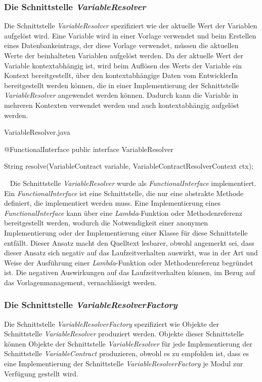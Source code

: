 \subsubsection{Die Schnittstelle \emph{VariableResolver}}
\label{sec:variableResolver}
Die Schnittstelle \emph{VariableResolver} spezifiziert wie der aktuelle Wert der Variablen aufgelöst wird. Eine Variable wird in einer Vorlage verwendet und beim Erstellen eines Datenbankeintrags, der diese Vorlage verwendet, müssen die aktuellen Werte der beinhalteten Variablen aufgelöst werden. Da der aktuelle Wert der Variable kontextabhängig ist, wird beim Auflösen des Werts der Variable ein Kontext bereitgestellt, über den kontextabhängige Daten vom EntwicklerIn bereitgestellt werden können, die in einer Implementierung der Schnittstelle \emph{VariableResolver} angewendet werden können. Dadurch kann die Variable in mehreren Kontexten verwendet werden und auch kontextabhängig aufgelöst werden.
\begin{program}[h]
\caption{VariableResolver.java}
\label{prog:variableResolver}
\begin{JavaCode}
@FunctionalInterface
public interface VariableResolver {

    String resolve(VariableContract variable,
                   VariableContractResolverContext ctx);
}
\end{JavaCode}
\end{program}
\ \newline
Die Schnittstelle \emph{VariableResolver} wurde als \emph{FunctionalInterface} implementiert. Ein \emph{FunctionalInterface} ist eine Schnittstelle, die nur eine abstrakte Methode definiert, die implementiert werden muss. Eine Implementierung eines \emph{FunctionalInterface} kann über eine \emph{Lambda}-Funktion oder Methodenreferenz bereitgestellt werden, wodurch die Notwendigkeit einer anonymen Implementierung oder der Implementierung einer Klasse für diese Schnittstelle entfällt. Dieser Ansatz macht den Quelltext lesbarer, obwohl angemerkt sei, dass dieser Ansatz sich negativ auf das Laufzeitverhalten auswirkt, was in der Art und Weise der Ausführung einer \emph{Lambda}-Funktion oder Methodenreferenz begründet ist. Die negativen Auswirkungen auf das Laufzeitverhalten können, im Bezug auf das Vorlagenmanagement, vernachlässigt werden.

\subsubsection{Die Schnittstelle \emph{VariableResolverFactory}}
\label{sec:variableResolverFactory}
Die Schnittstelle \emph{VariableResolverFactory} spezifiziert wie Objekte der Schnittstelle \emph{VariableResolver} produziert werden. Objekte dieser Schnittstelle können Objekte der Schnittstelle \emph{VariableResolver} für jede Implementierung der Schnittstelle \emph{VariableContract} produzieren, obwohl es zu empfohlen ist, dass es eine Implementierung der Schnittstelle \emph{VariableResolverFactory} je Modul zur Verfügung gestellt wird.

